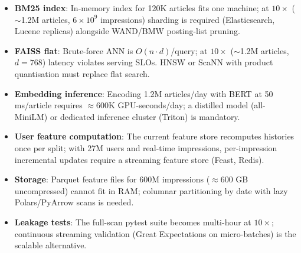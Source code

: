 \documentclass[11pt,a4paper]{article}
\begin{document}
\begin{itemize}
  \item \textbf{BM25 index}: In-memory index for 120K articles fits one machine; at $10{\times}$ ($\sim$1.2M articles, $6{\times}10^9$ impressions) sharding is required (Elasticsearch, Lucene replicas) alongside WAND/BMW posting-list pruning.
  \item \textbf{FAISS flat}: Brute-force ANN is $O(n \cdot d)$/query; at $10{\times}$ ($\sim$1.2M articles, $d{=}768$) latency violates serving SLOs.  HNSW or ScaNN with product quantisation must replace flat search.
  \item \textbf{Embedding inference}: Encoding 1.2M articles/day with BERT at 50 ms/article requires $\approx 600$K GPU-seconds/day; a distilled model (all-MiniLM) or dedicated inference cluster (Triton) is mandatory.
  \item \textbf{User feature computation}: The current feature store recomputes histories once per split; with 27M users and real-time impressions, per-impression incremental updates require a streaming feature store (Feast, Redis).
  \item \textbf{Storage}: Parquet feature files for 600M impressions ($\approx$600 GB uncompressed) cannot fit in RAM; columnar partitioning by date with lazy Polars/PyArrow scans is needed.
  \item \textbf{Leakage tests}: The full-scan pytest suite becomes multi-hour at $10{\times}$; continuous streaming validation (Great Expectations on micro-batches) is the scalable alternative.
\end{itemize}
\end{document}
